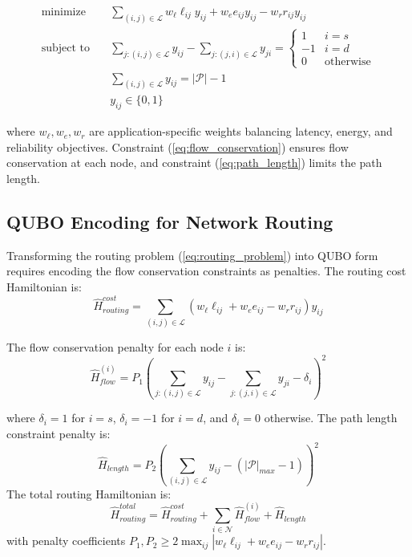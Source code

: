 \documentclass[lettersize,journal]{IEEEtran}
\begin{document}
\begin{subequations}
\label{eq:routing_problem}
\begin{align}
\text{minimize} \quad & \sum_{(i,j) \in \mathcal{L}} w_\ell \ell_{ij} y_{ij} + w_e e_{ij} y_{ij} - w_r r_{ij} y_{ij} \label{eq:routing_obj}\\
\text{subject to} \quad & \sum_{j:(i,j) \in \mathcal{L}} y_{ij} - \sum_{j:(j,i) \in \mathcal{L}} y_{ji} = \begin{cases}
1 & i = s \\
-1 & i = d \\
0 & \text{otherwise}
\end{cases} \label{eq:flow_conservation}\\
& \sum_{(i,j) \in \mathcal{L}} y_{ij} = |\mathcal{P}| - 1 \label{eq:path_length}\\
& y_{ij} \in \{0, 1\} \label{eq:binary_path}
\end{align}
\end{subequations}

where $w_\ell, w_e, w_r$ are application-specific weights balancing latency, energy, and reliability objectives. Constraint (\ref{eq:flow_conservation}) ensures flow conservation at each node, and constraint (\ref{eq:path_length}) limits the path length.

\subsection{QUBO Encoding for Network Routing}
\label{subsec:qubo_routing}

Transforming the routing problem (\ref{eq:routing_problem}) into QUBO form requires encoding the flow conservation constraints as penalties. The routing cost Hamiltonian is:
\begin{equation}
\hat{H}_{routing}^{cost} = \sum_{(i,j) \in \mathcal{L}} \left(w_\ell \ell_{ij} + w_e e_{ij} - w_r r_{ij}\right) y_{ij}
\label{eq:routing_cost_ham}
\end{equation}

The flow conservation penalty for each node $i$ is:
\begin{equation}
\hat{H}_{flow}^{(i)} = P_1 \left(\sum_{j:(i,j) \in \mathcal{L}} y_{ij} - \sum_{j:(j,i) \in \mathcal{L}} y_{ji} - \delta_i\right)^2
\label{eq:flow_penalty}
\end{equation}

where $\delta_i = 1$ for $i=s$, $\delta_i = -1$ for $i=d$, and $\delta_i = 0$ otherwise. The path length constraint penalty is:
\begin{equation}
\hat{H}_{length} = P_2 \left(\sum_{(i,j) \in \mathcal{L}} y_{ij} - (|\mathcal{P}|_{max} - 1)\right)^2
\label{eq:length_penalty}
\end{equation}
The total routing Hamiltonian is:
\begin{equation}
\hat{H}_{routing}^{total} = \hat{H}_{routing}^{cost} + \sum_{i \in \mathcal{N}} \hat{H}_{flow}^{(i)} + \hat{H}_{length}
\label{eq:routing_total_ham}
\end{equation}
with penalty coefficients $P_1, P_2 \geq 2\max_{ij}|w_\ell \ell_{ij} + w_e e_{ij} - w_r r_{ij}|$.
\end{document}

